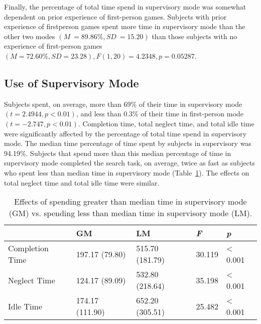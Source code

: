 Finally, the percentage of total time spend in supervisory mode was somewhat dependent on prior experience of first-person games. Subjects with prior experience of firstperson games spent more time in supervisory mode than the other two modes $(M~=89.86\%, SD~=15.20)$ than those subjects with no experience of first-person games $(M=72.60\%, SD=23.28), F(1,20)=4.2348, p=0.05287$.


\subsection{Use of Supervisory Mode} %
\label{sub:use_of_supervisory_mode}

Subjects spent, on average, more than 69\% of their time in supervisory mode $(t = 2.4944, p < 0.01)$, and less than 0.3\% of their time in first-person mode $(t = -2.747, p < 0.01)$.
Completion time, total neglect time, and total idle time were significantly affected by the percentage of total time spend in supervisory mode. The median time percentage of time spent by subjects in supervisory was 94.19\%. Subjects that spend more than this median percentage of time in supervisory mode completed the search task, on average, twice as fast as subjects who spent less than median time in supervisory mode (Table~\ref{tab:supervisory}). The effects on total neglect time and total idle time were similar.


\begin{table}[ht]
\label{tab:supervisory}
\begin{center}
	\begin{tabular}{| l | l | l | l | l |}
	\hline
		& \textbf{GM} & \textbf{LM} & \emph{F} & \emph{p}\\ \hline
		Completion Time & 197.17 (79.80) & 515.70 (181.79) & 30.119 & < 0.001\\ \hline
		Neglect Time & 124.17 (89.09) & 532.80 (218.64) & 35.198 & < 0.001\\ \hline
		Idle Time & 174.17 (111.90) & 652.20 (305.51) & 25.482 & < 0.001\\ \hline
	\hline
	\end{tabular}
	\caption{Effects of spending greater than median time in supervisory mode (GM) vs. spending less than median time in supervisory mode (LM).}
\end{center}
\end{table}


